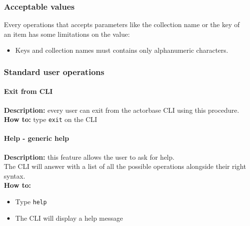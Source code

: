 \documentclass{scalatekids-article}
\begin{document}
\subsubsection{Acceptable values}
Every operations that accepts parameters like the collection name or the key of 
an item has some limitations on the value:
\begin{itemize}
  \item Keys and collection names must contains only alphanumeric characters.
\end{itemize}


\subsubsection{Standard user operations}
\label{sec:everyuser}

\paragraph{Exit from CLI}
\textbf{Description:} every user can exit from the actorbase CLI
using this procedure.\\
\textbf{How to:} type \texttt{exit} on the CLI


\paragraph{Help - generic help}
\label{sec:generichelp}
\textbf{Description:} this feature allows the user to ask for help.\\
The CLI will answer with a list of all the possible operations alongside
their right syntax.\\
\textbf{How to:}
\begin{itemize}
\item Type \texttt{help}
\item The CLI will display a help message
\end{itemize}

\end{document}
